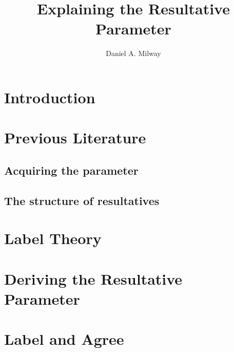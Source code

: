 \documentclass[draft]{ut-thesis}
\author{Daniel A. Milway}
\title{Explaining the Resultative Parameter}
\begin{document}
\begin{preliminary}
  \maketitle
\end{preliminary}
\chapter{Introduction}

\chapter{Previous Literature}\label{sec:litreview}
\section{Acquiring the parameter}\label{sec:learning}

\section{The structure of resultatives}

\chapter{Label Theory}

\chapter{Deriving the Resultative Parameter}\label{sec:deriving}

\chapter{Label and Agree}\label{sec:agree}


\printbibliography
\end{document}
